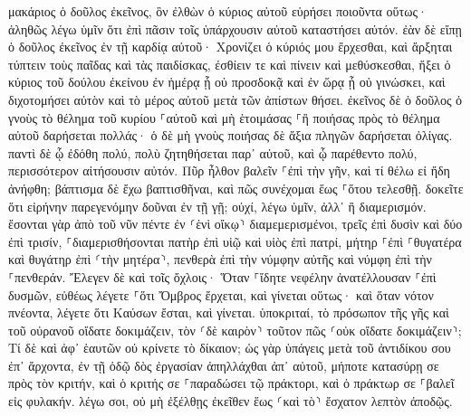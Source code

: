 \documentclass[twoside, 9pt]{extreport}
\begin{document}
μακάριος ὁ δοῦλος ἐκεῖνος, ὃν ἐλθὼν ὁ κύριος αὐτοῦ εὑρήσει ποιοῦντα οὕτως· 
ἀληθῶς λέγω ὑμῖν ὅτι ἐπὶ πᾶσιν τοῖς ὑπάρχουσιν αὐτοῦ καταστήσει αὐτόν. 
ἐὰν δὲ εἴπῃ ὁ δοῦλος ἐκεῖνος ἐν τῇ καρδίᾳ αὐτοῦ· Χρονίζει ὁ κύριός μου ἔρχεσθαι, καὶ ἄρξηται τύπτειν τοὺς παῖδας καὶ τὰς παιδίσκας, ἐσθίειν τε καὶ πίνειν καὶ μεθύσκεσθαι, 
ἥξει ὁ κύριος τοῦ δούλου ἐκείνου ἐν ἡμέρᾳ ᾗ οὐ προσδοκᾷ καὶ ἐν ὥρᾳ ᾗ οὐ γινώσκει, καὶ διχοτομήσει αὐτὸν καὶ τὸ μέρος αὐτοῦ μετὰ τῶν ἀπίστων θήσει. 
ἐκεῖνος δὲ ὁ δοῦλος ὁ γνοὺς τὸ θέλημα τοῦ κυρίου ⸀αὐτοῦ καὶ μὴ ἑτοιμάσας ⸀ἢ ποιήσας πρὸς τὸ θέλημα αὐτοῦ δαρήσεται πολλάς· 
ὁ δὲ μὴ γνοὺς ποιήσας δὲ ἄξια πληγῶν δαρήσεται ὀλίγας. παντὶ δὲ ᾧ ἐδόθη πολύ, πολὺ ζητηθήσεται παρ᾽ αὐτοῦ, καὶ ᾧ παρέθεντο πολύ, περισσότερον αἰτήσουσιν αὐτόν. 
Πῦρ ἦλθον βαλεῖν ⸀ἐπὶ τὴν γῆν, καὶ τί θέλω εἰ ἤδη ἀνήφθη; 
βάπτισμα δὲ ἔχω βαπτισθῆναι, καὶ πῶς συνέχομαι ἕως ⸀ὅτου τελεσθῇ. 
δοκεῖτε ὅτι εἰρήνην παρεγενόμην δοῦναι ἐν τῇ γῇ; οὐχί, λέγω ὑμῖν, ἀλλ᾽ ἢ διαμερισμόν. 
ἔσονται γὰρ ἀπὸ τοῦ νῦν πέντε ἐν ⸂ἑνὶ οἴκῳ⸃ διαμεμερισμένοι, τρεῖς ἐπὶ δυσὶν καὶ δύο ἐπὶ τρισίν, 
⸀διαμερισθήσονται πατὴρ ἐπὶ υἱῷ καὶ υἱὸς ἐπὶ πατρί, μήτηρ ⸀ἐπὶ ⸀θυγατέρα καὶ θυγάτηρ ἐπὶ ⸂τὴν μητέρα⸃, πενθερὰ ἐπὶ τὴν νύμφην αὐτῆς καὶ νύμφη ἐπὶ τὴν ⸀πενθεράν. 
Ἔλεγεν δὲ καὶ τοῖς ὄχλοις· Ὅταν ⸀ἴδητε νεφέλην ἀνατέλλουσαν ⸀ἐπὶ δυσμῶν, εὐθέως λέγετε ⸀ὅτι Ὄμβρος ἔρχεται, καὶ γίνεται οὕτως· 
καὶ ὅταν νότον πνέοντα, λέγετε ὅτι Καύσων ἔσται, καὶ γίνεται. 
ὑποκριταί, τὸ πρόσωπον τῆς γῆς καὶ τοῦ οὐρανοῦ οἴδατε δοκιμάζειν, τὸν ⸂δὲ καιρὸν⸃ τοῦτον πῶς ⸂οὐκ οἴδατε δοκιμάζειν⸃; 
Τί δὲ καὶ ἀφ᾽ ἑαυτῶν οὐ κρίνετε τὸ δίκαιον; 
ὡς γὰρ ὑπάγεις μετὰ τοῦ ἀντιδίκου σου ἐπ᾽ ἄρχοντα, ἐν τῇ ὁδῷ δὸς ἐργασίαν ἀπηλλάχθαι ἀπ᾽ αὐτοῦ, μήποτε κατασύρῃ σε πρὸς τὸν κριτήν, καὶ ὁ κριτής σε ⸀παραδώσει τῷ πράκτορι, καὶ ὁ πράκτωρ σε ⸀βαλεῖ εἰς φυλακήν. 
λέγω σοι, οὐ μὴ ἐξέλθῃς ἐκεῖθεν ἕως ⸂καὶ τὸ⸃ ἔσχατον λεπτὸν ἀποδῷς. 
\end{document}
